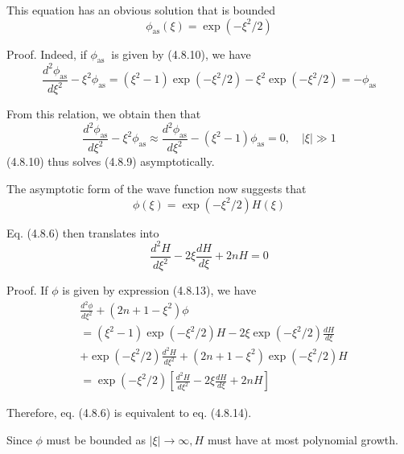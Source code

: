 \documentclass{article}
\begin{document}
This equation has an obvious solution that is bounded
$$
\begin{equation*}
\phi_{\mathrm{as}}(\xi)=\exp \left(-\xi^{2} / 2\right) \tag{4.8.10}
\end{equation*}
$$

Proof. Indeed, if $\phi_{\text {as }}$ is given by (4.8.10), we have
$$
\begin{equation*}
\frac{d^{2} \phi_{\mathrm{as}}}{d \xi^{2}}-\xi^{2} \phi_{\mathrm{as}}=\left(\xi^{2}-1\right) \exp \left(-\xi^{2} / 2\right)-\xi^{2} \exp \left(-\xi^{2} / 2\right)=-\phi_{\mathrm{as}} \tag{4.8.11}
\end{equation*}
$$

From this relation, we obtain then that
$$
\begin{equation*}
\frac{d^{2} \phi_{\mathrm{as}}}{d \xi^{2}}-\xi^{2} \phi_{\mathrm{as}} \approx \frac{d^{2} \phi_{\mathrm{as}}}{d \xi^{2}}-\left(\xi^{2}-1\right) \phi_{\mathrm{as}}=0, \quad|\xi| \gg 1 \tag{4.8.12}
\end{equation*}
$$
(4.8.10) thus solves (4.8.9) asymptotically.

The asymptotic form of the wave function now suggests that
$$
\begin{equation*}
\phi(\xi)=\exp \left(-\xi^{2} / 2\right) H(\xi) \tag{4.8.13}
\end{equation*}
$$

Eq. (4.8.6) then translates into
$$
\begin{equation*}
\frac{d^{2} H}{d \xi^{2}}-2 \xi \frac{d H}{d \xi}+2 n H=0 \tag{4.8.14}
\end{equation*}
$$

Proof. If $\phi$ is given by expression (4.8.13), we have
$$
\begin{align*}
& \frac{d^{2} \phi}{d \xi^{2}}+\left(2 n+1-\xi^{2}\right) \phi  \tag{4.8.15}\\
& =\left(\xi^{2}-1\right) \exp \left(-\xi^{2} / 2\right) H-2 \xi \exp \left(-\xi^{2} / 2\right) \frac{d H}{d \xi} \\
& +\exp \left(-\xi^{2} / 2\right) \frac{d^{2} H}{d \xi^{2}}+\left(2 n+1-\xi^{2}\right) \exp \left(-\xi^{2} / 2\right) H \\
& =\exp \left(-\xi^{2} / 2\right)\left[\frac{d^{2} H}{d \xi^{2}}-2 \xi \frac{d H}{d \xi}+2 n H\right]
\end{align*}
$$

Therefore, eq. (4.8.6) is equivalent to eq. (4.8.14).

Since $\phi$ must be bounded as $|\xi| \rightarrow \infty, H$ must have at most polynomial growth.
\end{document}

